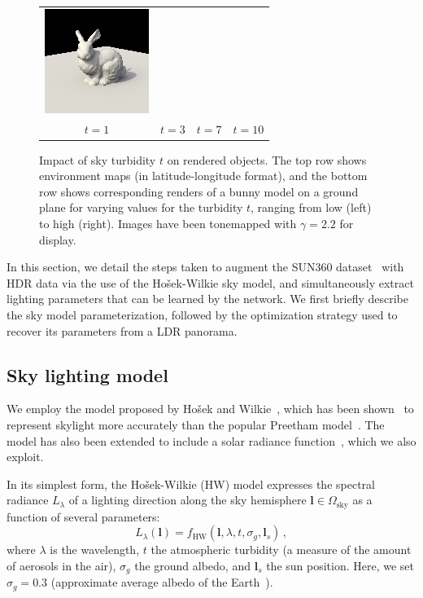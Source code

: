 \begin{figure}
\begin{tabular}{cccc}
\includegraphics[width=.24\linewidth]{figures/hwmodel/t_10.png} \\
$t = 1$ & $t = 3$ & $t = 7$ & $t = 10$ 
\end{tabular}
\caption[Impact of sky turbidity $t$ on rendered objects]{Impact of sky turbidity $t$ on rendered objects. The top row shows environment maps (in latitude-longitude format), and the bottom row shows corresponding renders of a bunny model on a ground plane for varying values for the turbidity $t$, ranging from low (left) to high (right). Images have been tonemapped with $\gamma = 2.2$ for display.}
\label{fig:turbidity-comparison}
\end{figure}

In this section, we detail the steps taken to augment the SUN360 dataset~\cite{xiao-cvpr-12} with HDR data via the use of the Ho\v{s}ek-Wilkie sky model, and simultaneously extract lighting parameters that can be learned by the network. We first briefly describe the sky model parameterization, followed by the optimization strategy used to recover its parameters from a LDR panorama. 

\subsection{Sky lighting model}

We employ the model proposed by Ho\v{s}ek and Wilkie~\cite{hosek-siggraph-12}, which has been shown~\cite{kider-tog-14} to represent skylight more accurately than the popular Preetham model~\cite{preetham-siggraph-99}. The model has also been extended to include a solar radiance function~\cite{hosek-cga-13}, which we also exploit.

In its simplest form, the Ho\v{s}ek-Wilkie (HW) model expresses the spectral radiance $L_\lambda$ of a lighting direction along the sky hemisphere $\mathbf{l} \in \Omega_\text{sky}$ as a function of several parameters:
%
\begin{equation}
L_\lambda(\mathbf{l}) = f_\text{HW}(\mathbf{l}, \lambda, t, \sigma_g, \mathbf{l}_s) \,,
\end{equation}
%
where $\lambda$ is the wavelength, $t$ the atmospheric turbidity (a measure of the amount of aerosols in the air), $\sigma_g$ the ground albedo, and $\mathbf{l}_s$ the sun position. Here, we set $\sigma_g = 0.3$ (approximate average albedo of the Earth~\cite{goode-grl-01}). 

